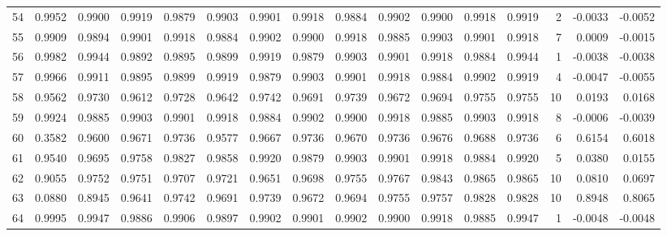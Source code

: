 \begin{tabular}{lrrrrrrrrrrrrrrr}
54  &      0.9952 &  0.9900 &  0.9919 &  0.9879 &  0.9903 &  0.9901 &  0.9918 &  0.9884 &  0.9902 &  0.9900 &   0.9918 &     0.9919 &      2 &                   -0.0033 &                    -0.0052 \\
55  &      0.9909 &  0.9894 &  0.9901 &  0.9918 &  0.9884 &  0.9902 &  0.9900 &  0.9918 &  0.9885 &  0.9903 &   0.9901 &     0.9918 &      7 &                    0.0009 &                    -0.0015 \\
56  &      0.9982 &  0.9944 &  0.9892 &  0.9895 &  0.9899 &  0.9919 &  0.9879 &  0.9903 &  0.9901 &  0.9918 &   0.9884 &     0.9944 &      1 &                   -0.0038 &                    -0.0038 \\
57  &      0.9966 &  0.9911 &  0.9895 &  0.9899 &  0.9919 &  0.9879 &  0.9903 &  0.9901 &  0.9918 &  0.9884 &   0.9902 &     0.9919 &      4 &                   -0.0047 &                    -0.0055 \\
58  &      0.9562 &  0.9730 &  0.9612 &  0.9728 &  0.9642 &  0.9742 &  0.9691 &  0.9739 &  0.9672 &  0.9694 &   0.9755 &     0.9755 &     10 &                    0.0193 &                     0.0168 \\
59  &      0.9924 &  0.9885 &  0.9903 &  0.9901 &  0.9918 &  0.9884 &  0.9902 &  0.9900 &  0.9918 &  0.9885 &   0.9903 &     0.9918 &      8 &                   -0.0006 &                    -0.0039 \\
60  &      0.3582 &  0.9600 &  0.9671 &  0.9736 &  0.9577 &  0.9667 &  0.9736 &  0.9670 &  0.9736 &  0.9676 &   0.9688 &     0.9736 &      6 &                    0.6154 &                     0.6018 \\
61  &      0.9540 &  0.9695 &  0.9758 &  0.9827 &  0.9858 &  0.9920 &  0.9879 &  0.9903 &  0.9901 &  0.9918 &   0.9884 &     0.9920 &      5 &                    0.0380 &                     0.0155 \\
62  &      0.9055 &  0.9752 &  0.9751 &  0.9707 &  0.9721 &  0.9651 &  0.9698 &  0.9755 &  0.9767 &  0.9843 &   0.9865 &     0.9865 &     10 &                    0.0810 &                     0.0697 \\
63  &      0.0880 &  0.8945 &  0.9641 &  0.9742 &  0.9691 &  0.9739 &  0.9672 &  0.9694 &  0.9755 &  0.9757 &   0.9828 &     0.9828 &     10 &                    0.8948 &                     0.8065 \\
64  &      0.9995 &  0.9947 &  0.9886 &  0.9906 &  0.9897 &  0.9902 &  0.9901 &  0.9902 &  0.9900 &  0.9918 &   0.9885 &     0.9947 &      1 &                   -0.0048 &                    -0.0048 \\

\end{tabular}
